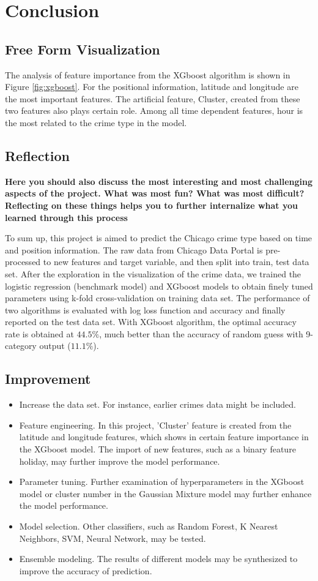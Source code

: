 \documentclass[12pt]{article}
\begin{document}
\section{Conclusion}
\subsection{Free Form Visualization}
The analysis of feature importance from the XGboost algorithm is shown in Figure \ref{fig:xgboost}. For the positional information, latitude and longitude are the most important features. The artificial feature, Cluster, created from these two features also plays certain role. Among all time dependent features, hour is the most related to the crime type in the model. 
\subsection{Reflection}

\textbf{Here you should also discuss the most interesting and most challenging aspects of the project. What was most fun? What was most difficult? Reflecting on these things helps you to further internalize what you learned through this process}

To sum up, this project is aimed to predict the Chicago crime type based on time and position information. The raw data from Chicago Data Portal is pre-processed to new features and target variable, and then split into train, test data set. After the exploration in the visualization of the crime data, we trained the logistic regression (benchmark model) and XGboost models to obtain finely tuned parameters using k-fold cross-validation on training data set. The performance of two algorithms is evaluated with log loss function and accuracy and finally reported on the test data set. With XGboost algorithm, the optimal accuracy rate is obtained at $44.5\%$, much better than the accuracy of random guess with 9-category output ($11.1\%$). 
\subsection{Improvement}
\begin{itemize}
\item Increase the data set. For instance, earlier crimes data might be included.
\item Feature engineering. In this project, 'Cluster' feature is created from the latitude and longitude features, which shows in certain feature importance in the XGboost model. The import of new features, such as a binary feature holiday, may further improve the model performance.
\item Parameter tuning. Further examination of hyperparameters in the XGboost model or cluster number in the Gaussian Mixture model may further enhance the model performance. 
\item Model selection. Other classifiers, such as Random Forest, K Nearest Neighbors, SVM, Neural Network, may be tested. 
\item Ensemble modeling. The results of different models may be synthesized to improve the accuracy of prediction.
\end{itemize}
\end{document}
